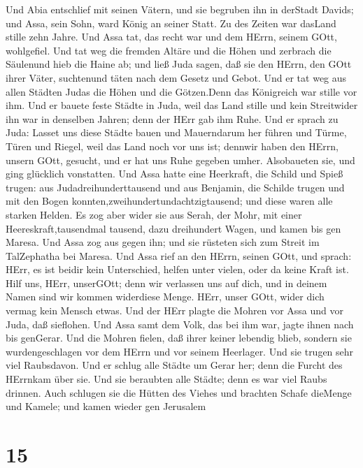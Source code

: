  Und Abia entschlief mit seinen Vätern, und sie begruben ihn
in derStadt Davids; und Assa, sein Sohn, ward König an seiner Statt. Zu
des Zeiten war dasLand stille zehn Jahre.  Und Assa tat, das
recht war und dem HErrn, seinem GOtt, wohlgefiel.  Und tat
weg die fremden Altäre und die Höhen und zerbrach die Säulenund hieb die
Haine ab;  und ließ Juda sagen, daß sie den HErrn, den GOtt
ihrer Väter, suchtenund täten nach dem Gesetz und Gebot. 
Und er tat weg aus allen Städten Judas die Höhen und die Götzen.Denn das
Königreich war stille vor ihm.  Und er bauete feste Städte
in Juda, weil das Land stille und kein Streitwider ihn war in denselben
Jahren; denn der HErr gab ihm Ruhe.  Und er sprach zu Juda:
Lasset uns diese Städte bauen und Mauerndarum her führen und Türme,
Türen und Riegel, weil das Land noch vor uns ist; dennwir haben den
HErrn, unsern GOtt, gesucht, und er hat uns Ruhe gegeben umher.
Alsobaueten sie, und ging glücklich vonstatten.  Und Assa
hatte eine Heerkraft, die Schild und Spieß trugen: aus
Judadreihunderttausend und aus Benjamin, die Schilde trugen und mit den
Bogen konnten,zweihundertundachtzigtausend; und diese waren alle starken
Helden.  Es zog aber wider sie aus Serah, der Mohr, mit
einer Heereskraft,tausendmal tausend, dazu dreihundert Wagen, und kamen
bis gen Maresa.  Und Assa zog aus gegen ihn; und sie
rüsteten sich zum Streit im TalZephatha bei Maresa.  Und
Assa rief an den HErrn, seinen GOtt, und sprach: HErr, es ist beidir
kein Unterschied, helfen unter vielen, oder da keine Kraft ist. Hilf
uns, HErr, unserGOtt; denn wir verlassen uns auf dich, und in deinem
Namen sind wir kommen widerdiese Menge. HErr, unser GOtt, wider dich
vermag kein Mensch etwas.  Und der HErr plagte die Mohren
vor Assa und vor Juda, daß sieflohen.  Und Assa samt dem
Volk, das bei ihm war, jagte ihnen nach bis genGerar. Und die Mohren
fielen, daß ihrer keiner lebendig blieb, sondern sie wurdengeschlagen
vor dem HErrn und vor seinem Heerlager. Und sie trugen sehr viel
Raubsdavon.  Und er schlug alle Städte um Gerar her; denn
die Furcht des HErrnkam über sie. Und sie beraubten alle Städte; denn es
war viel Raubs drinnen.  Auch schlugen sie die Hütten des
Viehes und brachten Schafe dieMenge und Kamele; und kamen wieder gen
Jerusalem

\hypertarget{section-14}{%
\section{15}\label{section-14}}

